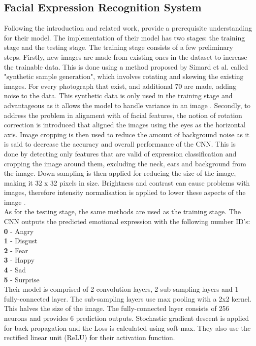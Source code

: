 \subsection{Facial Expression Recognition System}
Following the introduction and related work, \citeauthor{LOPES} provide a prerequisite understanding for their model. The implementation of their model has two stages: the training stage and the testing stage. The training stage consists of a few preliminary steps. Firstly, new images are made from existing ones in the dataset to increase the trainable data. This is done using a method proposed by Simard et al. called "synthetic sample generation", which involves rotating and skewing the existing images. For every photograph that exist, and additional 70 are made, adding noise to the data. This synthetic data is only used in the training stage and advantageous as it allows the model to handle variance in an image \citep{LOPES}. Secondly, to address the problem in alignment with of facial features, the notion of rotation correction is introduced that aligned the images using the eyes as the horizontal axis. Image cropping is then used to reduce the amount of background noise as it is said to decrease the accuracy and overall performance of the CNN. This is done by detecting only features that are valid of expression classification and cropping the image around them, excluding the neck, ears and background from the image.
Down sampling is then applied for reducing the size of the image, making it 32 x 32 pixels in size. Brightness and contrast can cause problems with images, therefore intensity normalisation is applied to lower these aspects of the image \citep{LOPES}. \\
As for the testing stage, the same methods are used as the training stage. The CNN outputs the predicted emotional expression with the following number ID's:\\
\textbf{0} - Angry\\
\textbf{1} - Disgust\\
\textbf{2} - Fear\\
\textbf{3} - Happy\\
\textbf{4} - Sad\\
\textbf{5} - Surprise\\

Their model is comprised of 2 convolution layers, 2 sub-sampling layers and 1 fully-connected layer. The sub-sampling layers use max pooling with a 2x2 kernel. This halves the size of the image. The fully-connected layer consists of 256 neurons and provides 6 prediction outputs. Stochastic gradient descent is applied for back propagation and the Loss is calculated using soft-max. They also use the rectified linear unit (ReLU) for their activation function.

